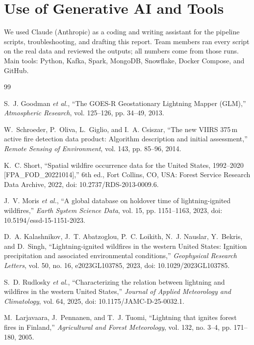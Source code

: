 \documentclass[10pt,journal,compsoc]{IEEEtran}
\begin{document}
\section*{Use of Generative AI and Tools}
We used Claude (Anthropic) as a coding and writing assistant for the pipeline scripts, troubleshooting, and drafting this report. Team members ran every script on the real data and reviewed the outputs; all numbers come from those runs. Main tools: Python, Kafka, Spark, MongoDB, Snowflake, Docker Compose, and GitHub.

\begin{thebibliography}{99}

S.~J. Goodman \textit{et al.}, ``The GOES-R Geostationary Lightning Mapper (GLM),'' \textit{Atmospheric Research}, vol. 125--126, pp. 34--49, 2013.

W.~Schroeder, P.~Oliva, L.~Giglio, and I.~A. Csiszar, ``The new VIIRS 375\,m active fire detection data product: Algorithm description and initial assessment,'' \textit{Remote Sensing of Environment}, vol. 143, pp. 85--96, 2014.

K.~C. Short, ``Spatial wildfire occurrence data for the United States, 1992--2020 [FPA\_FOD\_20221014],'' 6th ed., Fort Collins, CO, USA: Forest Service Research Data Archive, 2022, doi: 10.2737/RDS-2013-0009.6.

J.~V. Moris \textit{et al.}, ``A global database on holdover time of lightning-ignited wildfires,'' \textit{Earth System Science Data}, vol. 15, pp. 1151--1163, 2023, doi: 10.5194/essd-15-1151-2023.

D.~A. Kalashnikov, J.~T. Abatzoglou, P.~C. Loikith, N.~J. Nauslar, Y.~Bekris, and D.~Singh, ``Lightning-ignited wildfires in the western United States: Ignition precipitation and associated environmental conditions,'' \textit{Geophysical Research Letters}, vol. 50, no. 16, e2023GL103785, 2023, doi: 10.1029/2023GL103785.

S.~D. Rudlosky \textit{et al.}, ``Characterizing the relation between lightning and wildfires in the western United States,'' \textit{Journal of Applied Meteorology and Climatology}, vol. 64, 2025, doi: 10.1175/JAMC-D-25-0032.1.

M.~Larjavaara, J.~Pennanen, and T.~J. Tuomi, ``Lightning that ignites forest fires in Finland,'' \textit{Agricultural and Forest Meteorology}, vol. 132, no. 3--4, pp. 171--180, 2005.


\end{thebibliography}
\end{document}
